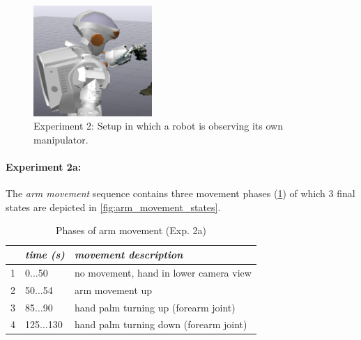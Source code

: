 \begin{figure}[h]
\captionsetup{width=0.45\textwidth}
\centering
\includegraphics[width=0.4\textwidth]{images/eval_vicon/sequence/setting.png}
\caption[Experiment 2: Setup]{Experiment 2: Setup in which a robot is observing its own manipulator.}
\label{fig:vicon_free_movement}
\end{figure}

\paragraph{Experiment 2a:}
The \textit{arm movement} sequence contains three movement phases (\cref{tab:vic_arm_movement_phases}) of which 3 final states are depicted in \cref{fig:arm_movement_states}.

\begin{table}[h]
\centering
\begin{tabular}{|c|l|l|}
\hline
 & \emph{time (s)} & \emph{movement description} \\
\hline
1 & 0$\dots$50 & no movement, hand in lower camera view \\
\hline
2 & 50$\dots$54 & arm movement up \\
\hline
3 & 85$\dots$90 & hand palm turning up (forearm joint) \\
\hline
4 & 125$\dots$130 & hand palm turning down (forearm joint) \\
\hline
\end{tabular}
\caption{Phases of arm movement (Exp. 2a)}
\label{tab:vic_arm_movement_phases}
\end{table}

\newlength{\imgwidth}
\setlength{\imgwidth}{0.26\textwidth}

